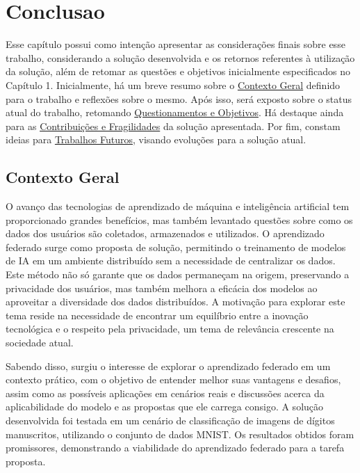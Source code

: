 \chapter[Conclusao]{Conclusao}
\label{chap:conclusao}

Esse capítulo possui como intenção apresentar as considerações finais sobre esse trabalho, considerando a solução desenvolvida e os retornos referentes à utilização da solução, além de retomar as questões e objetivos inicialmente especificados no Capítulo 1. Inicialmente, há um breve resumo sobre o \hyperref[sec:contexto]{Contexto Geral} definido para o trabalho e reflexões sobre o mesmo. Após isso, será exposto sobre o status atual do trabalho, retomando \hyperref[sec:questionamentos]{Questionamentos e Objetivos}. Há destaque ainda para as \hyperref[sec:contribuicoes]{Contribuições e Fragilidades} da solução apresentada.  Por fim, constam ideias para \hyperref[sec:trabalhos-futuros]{Trabalhos Futuros}, visando evoluções para a solução atual.

\section{Contexto Geral}
\label{sec:contexto}

O avanço das tecnologias de aprendizado de máquina e inteligência artificial tem proporcionado grandes benefícios, mas também levantado questões sobre como os dados dos usuários são coletados, armazenados e utilizados. O aprendizado federado surge como proposta de solução, permitindo o treinamento de modelos de IA em um ambiente distribuído sem a necessidade de centralizar os dados. Este método não só garante que os dados permaneçam na origem, preservando a privacidade dos usuários, mas também melhora a eficácia dos modelos ao aproveitar a diversidade dos dados distribuídos. A motivação para explorar este tema reside na necessidade de encontrar um equilíbrio entre a inovação tecnológica e o respeito pela privacidade, um tema de relevância crescente na sociedade atual.

Sabendo disso, surgiu o interesse de explorar o aprendizado federado em um contexto prático, com o objetivo de entender melhor suas vantagens e desafios, assim como as possíveis aplicações em cenários reais e discussões acerca da aplicabilidade do modelo e as propostas que ele carrega consigo. A solução desenvolvida foi testada em um cenário de classificação de imagens de dígitos manuscritos, utilizando o conjunto de dados MNIST. Os resultados obtidos foram promissores, demonstrando a viabilidade do aprendizado federado para a tarefa proposta.

